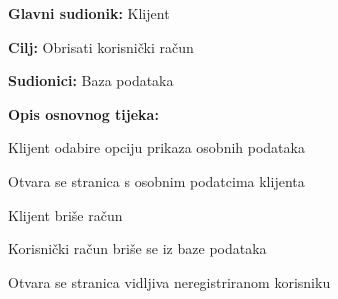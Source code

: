 					\noindent {}
					\begin{packed_item}
	
						\item \textbf{Glavni sudionik: }Klijent
						\item  \textbf{Cilj:} Obrisati korisnički račun
						\item  \textbf{Sudionici:} Baza podataka
						\item  \textbf{Opis osnovnog tijeka:}
						
						\item[] \begin{packed_enum}
	
							\item Klijent odabire opciju prikaza osobnih podataka
							\item Otvara se stranica s osobnim podatcima klijenta
							\item Klijent briše račun
							\item Korisnički račun briše se iz baze podataka
							\item Otvara se stranica vidljiva neregistriranom korisniku
						\end{packed_enum}
						
					\end{packed_item}
					
